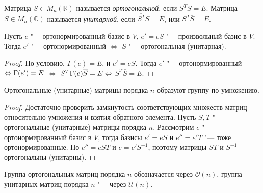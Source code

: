 \begin{definition}
	Матрица $S \in M_n(\mathbb{R})$ называется \textit{ортогональной}, если $S^TS = E$. Матрица $S \in M_n(\mathbb{C})$ называется \textit{унитарной}, если $\overline{S^T}S = E$, или $S^T\overline{S} = E$.
\end{definition}

\begin{theorem}
	Пусть $e$ "--- ортонормированный базис в $V$, $e' = eS$ "--- произвольный базис в $V$. Тогда $e'$ "--- ортонормированный $\Leftrightarrow$ $S$ "--- ортогональная (унитарная).
\end{theorem}

\begin{proof}
	По условию, $\Gamma(e) = E$, и $e' = eS$. Тогда $e'$ "--- ортонормированный $\hm\Leftrightarrow \Gamma(e') = E$ $\Leftrightarrow$ $S^T\Gamma(e)\overline{S} \hm{=} E \hm{\Leftrightarrow}$ $S^T\overline{S} = E$.
\end{proof}

\begin{proposition}
	Ортогональные (унитарные) матрицы порядка $n$ образуют группу по умножению.
\end{proposition}

\begin{proof}
	Достаточно проверить замкнутость соответствующих множеств матриц относительно умножения и взятия обратного элемента. Пусть $S, T$ "--- ортогональные (унитарные) матрицы порядка $n$. Рассмотрим $e$ "--- ортонормированный базис в $V$, тогда базисы $e' = eS$ и $e'' = e'T$ "--- тоже ортонормированные. Но $e'' = eST$ и $e = e'S^{-1}$, поэтому матрицы $ST$ и $S^{-1}$ ортогональны (унитарны).
\end{proof}

\begin{definition}
	Группа ортогональных матриц порядка $n$ обозначается через $\mathcal{O}(n)$, группа унитарных матриц порядка $n$ "--- через $\mathcal{U}(n)$.
\end{definition}